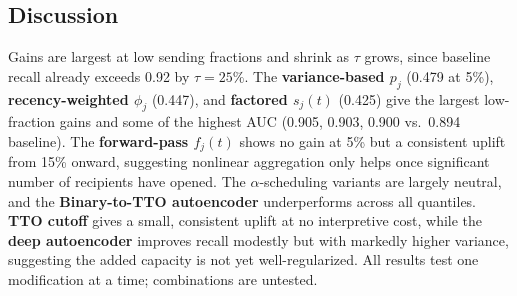 \subsection{Discussion}
\label{sec:discussion}

Gains are largest at low sending fractions and shrink as $\tau$ grows,
since baseline recall already exceeds 0.92 by $\tau=25\%$. The
\textbf{variance-based $p_j$} (0.479 at 5\%), \textbf{recency-weighted
$\phi_j$} (0.447), and \textbf{factored $s_j(t)$} (0.425) give the
largest low-fraction gains and some of the highest AUC (0.905, 0.903, 0.900 vs.\
0.894 baseline). The \textbf{forward-pass $f_j(t)$} shows no gain at 5\%
but a consistent uplift from 15\% onward, suggesting nonlinear
aggregation only helps once significant number of recipients have opened. The
$\alpha$-scheduling variants are largely neutral, and the
\textbf{Binary-to-TTO autoencoder} underperforms across all quantiles.
\textbf{TTO cutoff} gives a small, consistent uplift at no interpretive
cost, while the \textbf{deep autoencoder} improves recall modestly but
with markedly higher variance, suggesting the added capacity is not yet
well-regularized. All results test one modification at a time;
combinations are untested.
